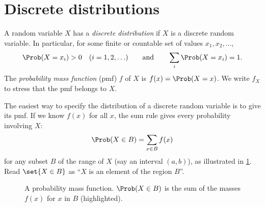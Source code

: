 \section{Discrete distributions}\label{sec:discrete-distributions}

\begin{definition}\label{def:discrete-distribution}
A random variable $X$ has a \emph{discrete distribution} if $X$ is a discrete random variable. In particular, for some finite or countable set of values $x_1, x_2, \ldots$,
\[
  \Prob(X = x_i) > 0 \quad (i = 1, 2, \ldots) \qquad \text{and} \qquad \sum_i \Prob(X = x_i) = 1.
\]
The \emph{probability mass function} (pmf) $f$ of $X$ is $f(x) = \Prob(X = x)$. We write $f_X$ to stress that the pmf belongs to $X$.
\end{definition}

The easiest way to specify the distribution of a discrete random variable is to give its pmf. If we know $f(x)$ for all $x$, the sum rule gives every probability involving $X$:
\begin{equation}\label{eq:pmf-sum-rule}
  \Prob(X \in B) = \sum_{x \in B} f(x)
\end{equation}
for any subset $B$ of the range of $X$ (say an interval $(a, b)$), as illustrated in \cref{fig:pmf-sum-rule}. Read $\set{X \in B}$ as ``$X$ is an element of the region $B$''.

\begin{figure}[ht]
\centering
{}
\caption{A probability mass function. $\Prob(X \in B)$ is the sum of the masses $f(x)$ for $x$ in $B$ (highlighted).}
\label{fig:pmf-sum-rule}
\end{figure}

